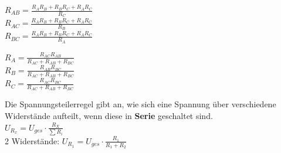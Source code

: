 \begin{minipage}{0.5\textwidth}
	\begin{center}

	${R}_{AB}=\frac{{R}_{A}{R}_{B}+{R}_{B}{R}_{C}+{R}_{A}{R}_{C}}{{R}_{C}}$\\
	${R}_{AC}=\frac{{R}_{A}{R}_{B}+{R}_{B}{R}_{C}+{R}_{A}{R}_{C}}{{R}_{B}}$\\
	${R}_{BC}=\frac{{R}_{A}{R}_{B}+{R}_{B}{R}_{C}+{R}_{A}{R}_{C}}{{R}_{A}}$\\

	\end{center}
\end{minipage}
\begin{minipage}{0.5\textwidth}
\begin{center}

		${R}_A=\frac{{R}_{AC}{R}_{AB}}{{R}_{AC}+{R}_{AB}+{R}_{BC}}$\\
		${R}_B=\frac{{R}_{AB}{R}_{BC}}{{R}_{AC}+{R}_{AB}+{R}_{BC}}$\\
		${R}_C=\frac{{R}_{AC}{R}_{BC}}{{R}_{AC}+{R}_{AB}+{R}_{BC}}$

	\end{center}
\end{minipage}

\newpage



										\begingl
										Die Spannungsteilerregel gibt an, wie sich eine Spannung über verschiedene Widerstände aufteilt, wenn diese in \textbf{Serie} geschaltet sind. \\
											\formulaBegin
											$\displaystyle U_{R_x} = U_{ges} \cdot \frac{R_X}{\sum R_i}$
											\\
											2 Widerstände: $
											U_{R_1}  = U_{ges} \cdot \frac{R_1}{R_1 + R_2}$
											\formulaEnd

											\begin{center}
											\end{center}
										\iend


